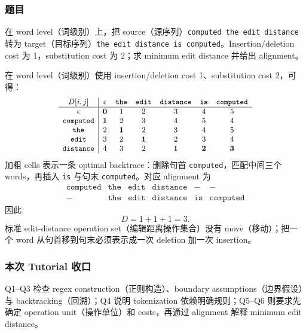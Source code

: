 \subsubsection*{题目}

在 word level（词级别）上，把 source（源序列）\texttt{computed the edit distance} 转为 target（目标序列）\texttt{the edit distance is computed}。Insertion/deletion cost 为 1，substitution cost 为 2；求 minimum edit distance 并给出 alignment。

\begin{checkedsolution}
在 word level（词级别）使用 insertion/deletion cost 1、substitution cost 2，可得：
\[
\small
\begin{array}{c|cccccc}
  D[i,j] & \epsilon & \texttt{the} & \texttt{edit} & \texttt{distance} & \texttt{is} & \texttt{computed} \\
  \hline
  \epsilon           & \mathbf{0} & 1 & 2 & 3 & 4 & 5 \\
  \texttt{computed}  & \mathbf{1} & 2 & 3 & 4 & 5 & 4 \\
  \texttt{the}       & 2 & \mathbf{1} & 2 & 3 & 4 & 5 \\
  \texttt{edit}      & 3 & 2 & \mathbf{1} & 2 & 3 & 4 \\
  \texttt{distance}  & 4 & 3 & 2 & \mathbf{1} & \mathbf{2} & \mathbf{3}
\end{array}
\]
加粗 cells 表示一条 optimal backtrace：删除句首 \texttt{computed}，匹配中间三个 words，再插入 \texttt{is} 与句末 \texttt{computed}。对应 alignment 为
\[
\begin{array}{c|c|c|c|c|c}
\texttt{computed}&\texttt{the}&\texttt{edit}&\texttt{distance}&-&-\\
-&\texttt{the}&\texttt{edit}&\texttt{distance}&\texttt{is}&\texttt{computed}
\end{array}
\]
因此
\[
  \boxed{D=1+1+1=3}.
\]
标准 edit-distance operation set（编辑距离操作集合）没有 move（移动）；把一个 word 从句首移到句末必须表示成一次 deletion 加一次 insertion。
\end{checkedsolution}

\subsubsection*{本次 Tutorial 收口}

Q1--Q3 检查 regex construction（正则构造）、boundary assumptions（边界假设）与 backtracking（回溯）；Q4 说明 tokenization 依赖明确规则；Q5--Q6 则要求先确定 operation unit（操作单位）和 costs，再通过 alignment 解释 minimum edit distance。
